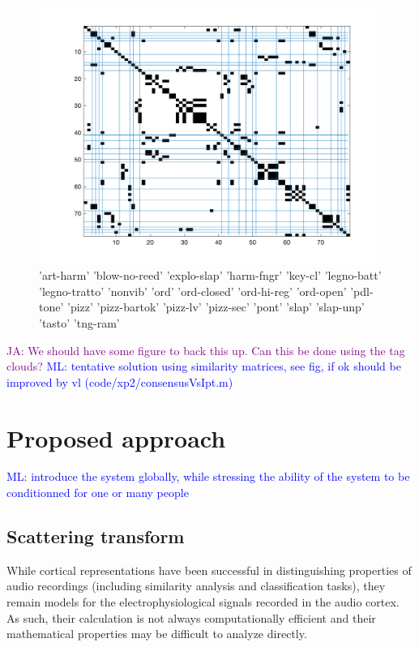 \documentclass{bmcart}
\newcommand{\ml}[1]{\textcolor{blue}{ML: #1}}
\newcommand{\ja}[1]{\textcolor{purple}{JA: #1}}
\begin{document}
\begin{figure}
\center
\includegraphics[width = \textwidth]{../code/xp2/consensusVsPt.png}
\caption{ 'art-harm'    'blow-no-reed'    'explo-slap'    'harm-fngr'    'key-cl'    'legno-batt'    'legno-tratto'
    'nonvib'    'ord'    'ord-closed'    'ord-hi-reg'    'ord-open'    'pdl-tone'    'pizz'    'pizz-bartok'
    'pizz-lv'    'pizz-sec'    'pont'    'slap'    'slap-unp'    'tasto'    'tng-ram'}
\label{fig:consensusVsIpt}
\end{figure}

\ja{We should have some figure to back this up.
Can this be done using the tag clouds?}
\ml{tentative solution using similarity matrices, see fig, if ok should be improved by vl (code/xp2/consensusVsIpt.m)}

\section*{Proposed approach}
\label{sec:method}

\ml{introduce the system globally, while stressing the ability of the system to be conditionned for one or many people}

\subsection*{Scattering transform}
\label{sec:scattering}

While cortical representations have been successful in distinguishing properties of audio recordings (including similarity analysis and classification tasks), they remain models for the electrophysiological signals recorded in the audio cortex.
As such, their calculation is not always computationally efficient and their mathematical properties may be difficult to analyze directly.
\end{document}
